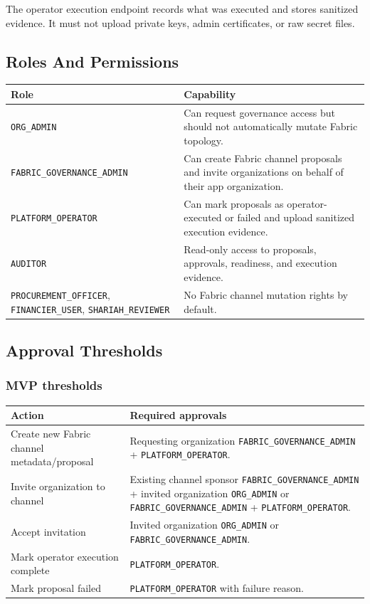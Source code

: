 The operator execution endpoint records what was executed and stores sanitized evidence. It must not upload private keys, admin certificates, or raw secret files.

\subsection{Roles And Permissions}

\begin{longtable}{p{}p{}}
\hline
\textbf{Role} & \textbf{Capability} \\
\hline
\texttt{ORG\_ADMIN} & Can request governance access but should not automatically mutate Fabric topology. \\
\hline
\texttt{FABRIC\_GOVERNANCE\_ADMIN} & Can create Fabric channel proposals and invite organizations on behalf of their app organization. \\
\hline
\texttt{PLATFORM\_OPERATOR} & Can mark proposals as operator-executed or failed and upload sanitized execution evidence. \\
\hline
\texttt{AUDITOR} & Read-only access to proposals, approvals, readiness, and execution evidence. \\
\hline
\texttt{PROCUREMENT\_OFFICER}, \texttt{FINANCIER\_USER}, \texttt{SHARIAH\_REVIEWER} & No Fabric channel mutation rights by default. \\
\hline
\end{longtable}

\subsection{Approval Thresholds}

\subsubsection{MVP thresholds}

\begin{longtable}{p{}p{}}
\hline
\textbf{Action} & \textbf{Required approvals} \\
\hline
Create new Fabric channel metadata/proposal & Requesting organization \texttt{FABRIC\_GOVERNANCE\_ADMIN} + \texttt{PLATFORM\_OPERATOR}. \\
\hline
Invite organization to channel & Existing channel sponsor \texttt{FABRIC\_GOVERNANCE\_ADMIN} + invited organization \texttt{ORG\_ADMIN} or \texttt{FABRIC\_GOVERNANCE\_ADMIN} + \texttt{PLATFORM\_OPERATOR}. \\
\hline
Accept invitation & Invited organization \texttt{ORG\_ADMIN} or \texttt{FABRIC\_GOVERNANCE\_ADMIN}. \\
\hline
Mark operator execution complete & \texttt{PLATFORM\_OPERATOR}. \\
\hline
Mark proposal failed & \texttt{PLATFORM\_OPERATOR} with failure reason. \\
\hline
\end{longtable}

